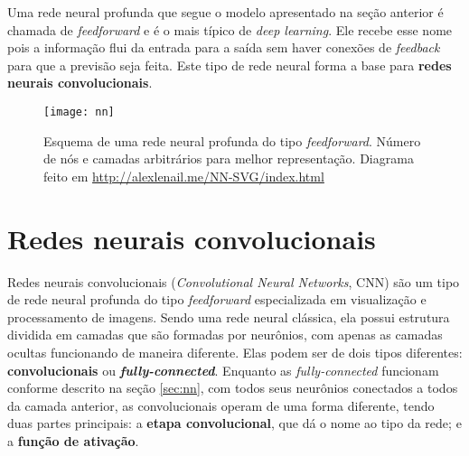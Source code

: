 Uma rede neural profunda que segue o modelo apresentado na seção anterior é chamada de \textit{feedforward} e é o mais típico de \textit{deep learning}.
Ele recebe esse nome pois a informação flui da entrada para a saída sem haver conexões de \textit{feedback} para que a previsão seja feita.
Este tipo de rede neural forma a base para \textbf{redes neurais convolucionais}.%

\begin{figure}[h!]
\texttt{[image: nn]}
\centering
\caption{Esquema de uma rede neural profunda do tipo \textit{feedforward}. Número de nós e camadas arbitrários para melhor representação. Diagrama feito em \url{http://alexlenail.me/NN-SVG/index.html}}
\end{figure}


\section{Redes neurais convolucionais}
\label{sec:cnn}

Redes neurais convolucionais (\textit{Convolutional Neural Networks}, CNN) são um tipo de rede neural profunda do tipo \textit{feedforward} especializada em visualização e processamento de imagens.
Sendo uma rede neural clássica, ela possui estrutura dividida em camadas que são formadas por neurônios, com apenas as camadas ocultas funcionando de maneira diferente.
Elas podem ser de dois tipos diferentes:
\textbf{convolucionais} ou \textbf{\textit{fully-connected}}.
Enquanto as \textit{fully-connected} funcionam conforme descrito na seção \ref{sec:nn}, com todos seus neurônios conectados a todos da camada anterior, as convolucionais operam de uma forma diferente, tendo duas partes principais:
a \textbf{etapa convolucional}, que dá o nome ao tipo da rede;
e a \textbf{função de ativação}.

